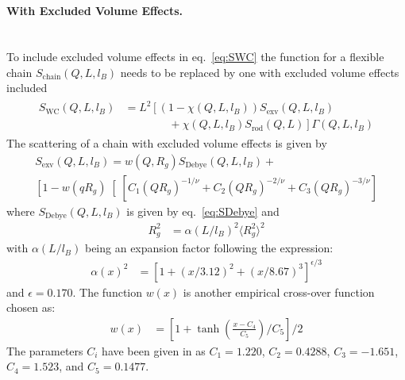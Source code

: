 ~\\
\paragraph*{\textbf{With Excluded Volume Effects.}}~\\

To include excluded volume effects in eq.\ \ref{eq:SWC} the function for a flexible chain $S_\text{chain}(Q,L,l_B)$ needs to be replaced by one with excluded volume effects included
\begin{align}
\label{eq:exvSWC}
\begin{split}
S_\text{WC}(Q,L,l_B) &= L^2 \left[  \left(1-\chi(Q,L,l_B)\right)
            S_\text{exv}(Q,L,l_B) \right. \\
&  \left. \qquad  \qquad  +\chi(Q,L,l_B) S_\text{rod}(Q,L)    \right] \Gamma(Q,L,l_B)
\end{split}
\end{align}
The scattering of a chain with excluded volume effects is given by
\begin{multline}
S_\text{exv}(Q,L,l_B) = w(Q,R_g) S_\text{Debye}(Q,L,l_B) + \\
 \left[1-w(q R_g)\right[\left[C_1\left(QR_g\right)^{-1/\nu}
                                           + C_2\left(QR_g\right)^{-2/\nu}
                                           + C_3\left(QR_g\right)^{-3/\nu}\right]
\end{multline}
where $S_\text{Debye}(Q,L,l_B)$ is given by eq.\ \ref{eq:SDebye} and
\begin{align}
R_g^2&=\alpha(L/l_B)^2 \langle R_g^2\rangle^2
\label{eq:RgexvWC}
\end{align}
with $\alpha(L/l_B)$ being an expansion factor following the expression:
\begin{align}
\alpha(x)^2 &= \left[ 1+(x/3.12)^2+(x/8.67)^3 \right]^{\epsilon/3}
\end{align}
and $\epsilon=0.170$. The function $w(x)$ is another empirical cross-over function chosen as:
\begin{align}
w(x) &= \left[ 1+\tanh\left(\frac{x-C_4}{C_5}\right)/C_5 \right]/2
\end{align}
The parameters $C_i$ have been given in \cite{Pedersen96Macrom} as
$C_1=1.220$, $C_2=0.4288$, $C_3=-1.651$, $C_4=1.523$, and $C_5=0.1477$.

